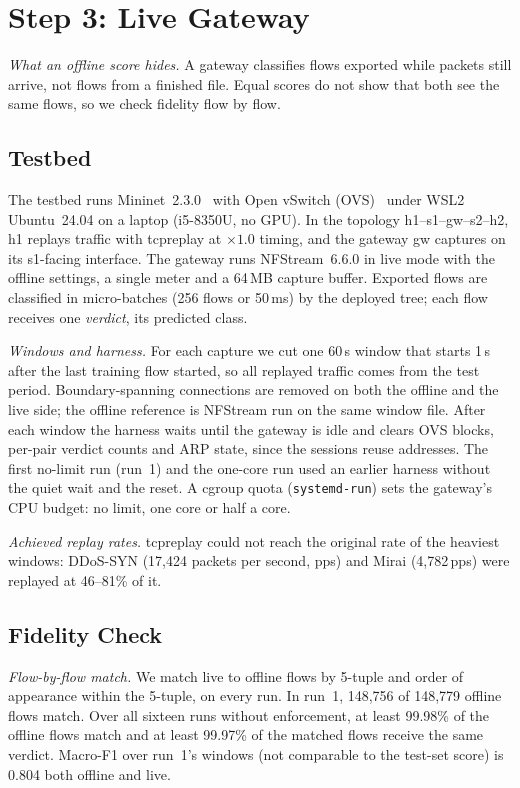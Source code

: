 \section{Step 3: Live Gateway}\label{sec:live}

\emph{What an offline score hides.} A gateway classifies flows exported while packets still arrive, not flows from a finished file. Equal scores do not show that both see the same flows, so we check fidelity flow by flow.

\subsection{Testbed}\label{sec:testbed}

The testbed runs Mininet~2.3.0~\cite{lantz2010mininet} with Open vSwitch (OVS)~\cite{pfaff2015ovs} under WSL2 Ubuntu~24.04 on a laptop (i5-8350U, no GPU). In the topology h1--s1--gw--s2--h2, h1 replays traffic with tcpreplay at $\times1.0$ timing, and the gateway gw captures on its s1-facing interface. The gateway runs NFStream~6.6.0 in live mode with the offline settings, a single meter and a 64\,MB capture buffer. Exported flows are classified in micro-batches (256 flows or 50\,ms) by the deployed tree; each flow receives one \emph{verdict}, its predicted class.

\emph{Windows and harness.} For each capture we cut one 60\,s window that starts 1\,s after the last training flow started, so all replayed traffic comes from the test period. Boundary-spanning connections are removed on both the offline and the live side; the offline reference is NFStream run on the same window file. After each window the harness waits until the gateway is idle and clears OVS blocks, per-pair verdict counts and ARP state, since the sessions reuse addresses. The first no-limit run (run~1) and the one-core run used an earlier harness without the quiet wait and the reset. A cgroup quota (\texttt{systemd-run}) sets the gateway's CPU budget: no limit, one core or half a core.

\emph{Achieved replay rates.} tcpreplay could not reach the original rate of the heaviest windows: DDoS-SYN (17,424 packets per second, pps) and Mirai (4,782\,pps) were replayed at 46--81\% of it.

\subsection{Fidelity Check}\label{sec:fidelity}

\emph{Flow-by-flow match.} We match live to offline flows by 5-tuple and order of appearance within the 5-tuple, on every run. In run~1, 148,756 of 148,779 offline flows match. Over all sixteen runs without enforcement, at least 99.98\% of the offline flows match and at least 99.97\% of the matched flows receive the same verdict. Macro-F1 over run~1's windows (not comparable to the test-set score) is 0.804 both offline and live.

